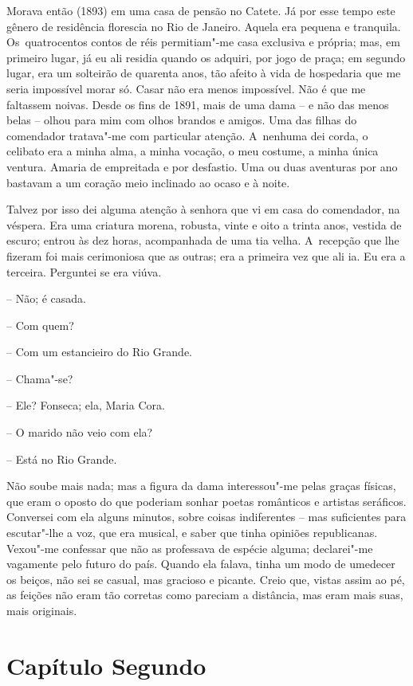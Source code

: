 Morava então (1893) em uma casa de pensão no Catete. Já por esse tempo
este gênero de residência florescia no Rio de Janeiro. Aquela era
pequena e tranquila. Os~quatrocentos contos de réis permitiam"-me casa
exclusiva e própria; mas, em primeiro lugar, já eu ali residia quando os
adquiri, por jogo de praça; em segundo lugar, era um solteirão de
quarenta anos, tão afeito à vida de hospedaria que me seria impossível
morar só. Casar não era menos impossível. Não é que me faltassem noivas.
Desde os fins de 1891, mais de uma dama -- e não das menos belas --
olhou para mim com olhos brandos e amigos. Uma das filhas do comendador
tratava"-me com particular atenção. A~nenhuma dei corda, o celibato era a
minha alma, a minha vocação, o meu costume, a minha única ventura.
Amaria de empreitada e por desfastio. Uma ou duas aventuras por ano
bastavam a um coração meio inclinado ao ocaso e à noite.

Talvez por isso dei alguma atenção à senhora que vi em casa do
comendador, na véspera. Era uma criatura morena, robusta, vinte e oito a
trinta anos, vestida de escuro; entrou às dez horas, acompanhada de uma
tia velha. A~recepção que lhe fizeram foi mais cerimoniosa que as
outras; era a primeira vez que ali ia. Eu era a terceira. Perguntei se
era viúva.

-- Não; é casada.

-- Com quem?

-- Com um estancieiro do Rio Grande.

-- Chama"-se?

-- Ele? Fonseca; ela, Maria Cora.

-- O marido não veio com ela?

-- Está no Rio Grande.

Não soube mais nada; mas a figura da dama interessou"-me pelas graças
físicas, que eram o oposto do que poderiam sonhar poetas românticos e
artistas seráficos. Conversei com ela alguns minutos, sobre coisas
indiferentes -- mas suficientes para escutar"-lhe a voz, que era musical,
e saber que tinha opiniões republicanas. Vexou"-me confessar que não as
professava de espécie alguma; declarei"-me vagamente pelo futuro do país.
Quando ela falava, tinha um modo de umedecer os beiços, não sei se
casual, mas gracioso e picante. Creio que, vistas assim ao pé, as
feições não eram tão corretas como pareciam a distância, mas eram mais
suas, mais originais.

\section{Capítulo Segundo}

